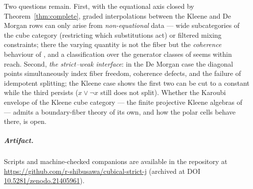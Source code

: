 \documentclass[11pt]{amsart}
\theoremstyle{definition}
\begin{document}
Two questions remain.  First, with the equational axis closed by
Theorem~\ref{thm:complete}, graded interpolations between the
Kleene and De Morgan rows can only arise from \emph{non-equational}
data --- wide subcategories of the cube category (restricting which
substitutions act) or filtered mixing constraints; there the
varying quantity is not the fiber but the \emph{coherence}
behaviour of \cite{StrictDM}, and a classification over the
generator classes of \cite{BuchholtzMorehouse} seems within
reach.  Second, \emph{the strict--weak interface}: in the De Morgan case
the diagonal points simultaneously index fiber freedom, coherence
defects, and the failure of idempotent splitting; the Kleene case
shows the first two can be cut to a constant while the third
persists ($x \vee \neg x$ still does not split).  Whether the
Karoubi envelope of the Kleene cube category — the finite projective
Kleene algebras of \cite{BovaCabrer} — admits a boundary-fiber
theory of its own, and how the polar cells behave there, is open.

\subparagraph*{Artifact.}  Scripts and machine-checked companions
are available in the repository at
\url{https://github.com/r-shibusawa/cubical-strict-j}
(archived at DOI \href{https://doi.org/10.5281/zenodo.21405961}%
{10.5281/zenodo.21405961}).
\end{document}

